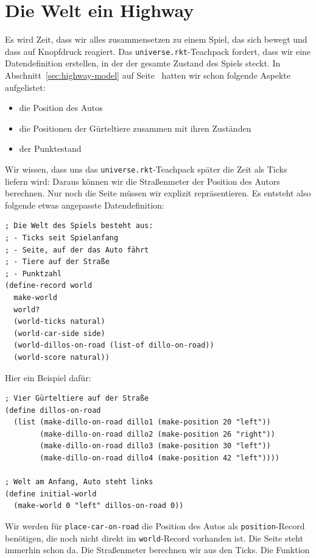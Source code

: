 \section{Die Welt ein Highway}

Es wird Zeit, dass wir alles zusammensetzen zu einem Spiel, das sich
bewegt und dass auf Knopfdruck reagiert.  Das
\texttt{universe.rkt}-Teachpack fordert, dass wir eine Datendefinition
erstellen, in der der gesamte Zustand des Spiels steckt.  In
Abschnitt~\ref{sec:highway-model} auf
Seite~\pageref{sec:highway-model} hatten wir schon folgende Aspekte
aufgelistet:
%
\begin{itemize}
\item die Position des Autos
\item die Positionen der Gürteltiere zusammen mit ihren Zuständen
\item der Punktestand
\end{itemize}
%
Wir wissen, dass uns das \texttt{universe.rkt}-Teachpack später die
Zeit als Ticks liefern wird: Daraus können wir die Straßenmeter der
Position des Autors berechnen.  Nur noch die Seite müssen wir explizit
repräsentieren.  Es entsteht also folgende etwas angepasste Datendefinition:
%
\begin{lstlisting}
; Die Welt des Spiels besteht aus:
; - Ticks seit Spielanfang
; - Seite, auf der das Auto fährt
; - Tiere auf der Straße
; - Punktzahl
(define-record world
  make-world
  world?
  (world-ticks natural)
  (world-car-side side)
  (world-dillos-on-road (list-of dillo-on-road))
  (world-score natural))
\end{lstlisting}
%
Hier ein Beispiel dafür:
%
\begin{lstlisting}
; Vier Gürteltiere auf der Straße
(define dillos-on-road
  (list (make-dillo-on-road dillo1 (make-position 20 "left"))
        (make-dillo-on-road dillo2 (make-position 26 "right"))
        (make-dillo-on-road dillo3 (make-position 30 "left"))
        (make-dillo-on-road dillo4 (make-position 42 "left"))))

; Welt am Anfang, Auto steht links
(define initial-world
  (make-world 0 "left" dillos-on-road 0))
\end{lstlisting}
%
Wir werden für \lstinline{place-car-on-road} die Position des Autos
als \lstinline{position}-Record benötigen, die noch nicht direkt im
\lstinline{world}-Record vorhanden ist.  Die Seite steht immerhin
schon da.  Die Straßenmeter berechnen wir aus den Ticks.  Die Funktion
